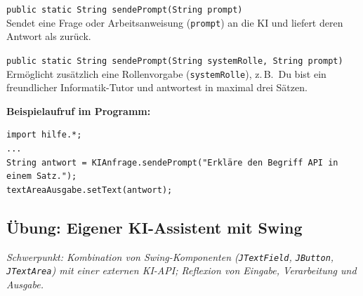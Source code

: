 \begin{compactitem}
  \item \lstinline|public static String sendePrompt(String prompt)|\\
  Sendet eine Frage oder Arbeitsanweisung (\lstinline|prompt|) an die KI und
  liefert deren Antwort als  zurück.
  \item \lstinline|public static String sendePrompt(String systemRolle, String prompt)|\\
  Ermöglicht zusätzlich eine Rollenvorgabe (\lstinline|systemRolle|), z.\,B.\
  \glqq Du bist ein freundlicher Informatik-Tutor und antwortest in maximal drei
  Sätzen.\grqq
\end{compactitem}

\medskip
\noindent \textbf{Beispielaufruf im Programm:}
\begin{lstlisting}
import hilfe.*;
...
String antwort = KIAnfrage.sendePrompt("Erkläre den Begriff API in einem Satz.");
textAreaAusgabe.setText(antwort);
\end{lstlisting}

\subsection{Übung: Eigener KI-Assistent mit Swing \tagPflicht}
\noindent \emph{Schwerpunkt: Kombination von Swing-Komponenten (\texttt{JTextField}, \texttt{JButton}, \texttt{JTextArea}) mit einer externen KI-API; Reflexion von Eingabe, Verarbeitung und Ausgabe.}

